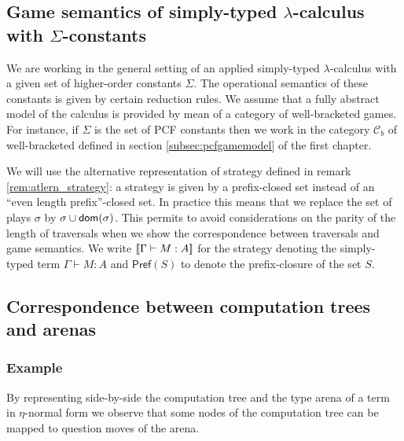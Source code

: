 \subsection{Game semantics of simply-typed $\lambda$-calculus with $\Sigma$-constants}
\label{sec:assumptions}

We are working in the general setting of an applied simply-typed $\lambda$-calculus with a given set of higher-order constants $\Sigma$.
The operational semantics of these constants is given by certain reduction rules.
We assume that a fully abstract model of the calculus is provided by mean of a category of well-bracketed games.
For instance, if $\Sigma$ is the set of PCF constants then we work in the category $\mathcal{C}_{b}$
of well-bracketed defined in section \ref{subsec:pcfgamemodel} of the first chapter.

We will use the alternative representation of strategy defined in remark \ref{rem:atlern_strategy}: a
strategy is given by a prefix-closed set instead of an ``even length
prefix''-closed set. In practice this means that we replace the set
of plays $\sigma$ by $\sigma \cup \textsf{dom}(\sigma)$. This
permits to avoid considerations on the parity of the length of
traversals when we show the correspondence between traversals and
game semantics. We write ${[\![ \Gamma \vdash M : A ]\!]}$ for the strategy denoting the simply-typed term
$\Gamma \vdash M : A$ and $\textsf{Pref}(S)$ to denote the
prefix-closure of the set $S$.


\subsection{Correspondence between computation trees and arenas}

\subsubsection{Example}
By representing side-by-side the computation tree and the type arena of a term in $\eta$-normal form we observe
that some nodes of the computation tree can be mapped to question moves of the arena.

